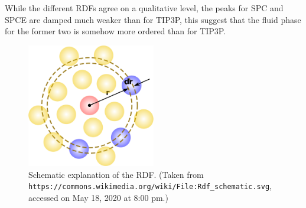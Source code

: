\documentclass[a4paper,10pt,bibtotoc]{scrartcl}
\begin{document}
While the different RDFs agree on a qualitative level, the peaks for SPC and SPCE are damped much weaker than for TIP3P, this suggest that the fluid phase for the former two is somehow more ordered than for TIP3P.

\begin{figure}[h]
\centering
\includegraphics[width=0.5\textwidth]{1024px-Rdf_schematic.png}
\caption{Schematic explanation of the RDF. (Taken from \texttt{https://commons.wikimedia.org/wiki/File:Rdf\_schematic.svg}, accessed on May 18, 2020 at 8:00 pm.)}
\label{fig:fig_rdf}
\end{figure}
\end{document}
